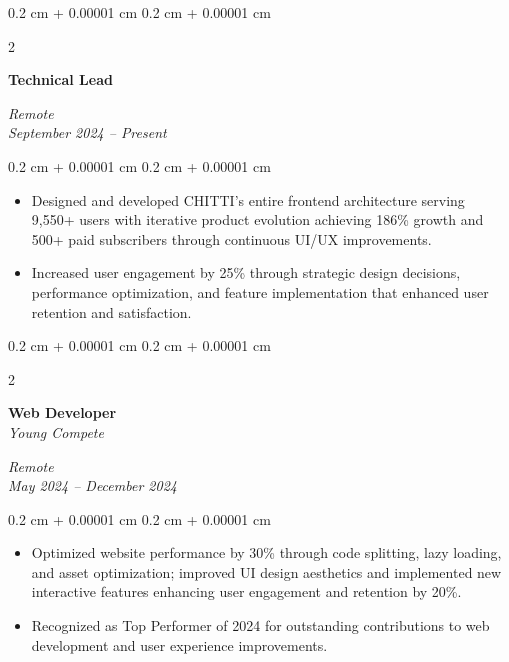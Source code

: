 \documentclass[10pt, letterpaper]{article}
\newenvironment{highlights}{
    \begin{itemize}[
        topsep=0.10 cm,
        parsep=0.10 cm,
        partopsep=0pt,
        itemsep=0pt,
        leftmargin=0.4 cm + 10pt
    ]
}{
    \end{itemize}
} %
\newenvironment{onecolentry}{
    \begin{adjustwidth}{
        0.2 cm + 0.00001 cm
    }{
        0.2 cm + 0.00001 cm
    }
}{
    \end{adjustwidth}
} %
\newenvironment{twocolentry}[2][]{
    \onecolentry
    \def\secondColumn{#2}
    \setcolumnwidth{\fill, 4.5 cm}
    \begin{paracol}{2}
}{
    \switchcolumn \raggedleft \secondColumn
    \end{paracol}
    \endonecolentry
} %
\let\hrefWithoutArrow\href
\renewcommand{\href}[2]{\hrefWithoutArrow{#1}{\ifthenelse{\equal{#2}{}}{ }{#2 }\raisebox{.15ex}{\footnotesize \faExternalLink*}}}
\begin{document}
    \vspace{0.2 cm}
    \begin{twocolentry}{
        \textit{Remote} \\
        \textit{September 2024 – Present}
    }
        \textbf{Technical Lead} \\
        \textit{\href{https://scorewithchitti.in/}{CHITTI}}
    \end{twocolentry}
    \vspace{0.10 cm}
    \begin{onecolentry}
        \begin{highlights}
            \item Designed and developed CHITTI's entire frontend architecture serving 9,550+ users with iterative product evolution achieving 186\% growth and 500+ paid subscribers through continuous UI/UX improvements.
            \item Increased user engagement by 25\% through strategic design decisions, performance optimization, and feature implementation that enhanced user retention and satisfaction.
        \end{highlights}
    \end{onecolentry}

    \vspace{0.2 cm}
    \begin{twocolentry}{
        \textit{Remote} \\
        \textit{May 2024 – December 2024}
    }
        \textbf{Web Developer} \\
        \textit{Young Compete}
    \end{twocolentry}
    \vspace{0.10 cm}
    \begin{onecolentry}
        \begin{highlights}
            \item Optimized website performance by 30\% through code splitting, lazy loading, and asset optimization; improved UI design aesthetics and implemented new interactive features enhancing user engagement and retention by 20\%.
            \item Recognized as Top Performer of 2024 for outstanding contributions to web development and user experience improvements.
        \end{highlights}
    \end{onecolentry}
\end{document}
